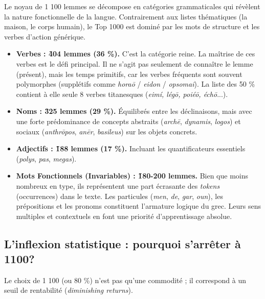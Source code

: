 {Le noyau de 1 100 lemmes se décompose en catégories grammaticales qui révèlent la nature
fonctionnelle de la langue. Contrairement aux listes thématiques (la maison, le corps humain), le
Top 1000 est dominé par les mots de structure et les verbes d'action générique.

\begin{itemize}\item \textbf{Verbes : \~ 404 lemmes (36 \%).} C'est la catégorie reine. La maîtrise de ces verbes est le défi principal. Il ne s'agit pas seulement de connaître le lemme (présent), mais les temps primitifs, car les verbes fréquents sont souvent polymorphes (supplétifs comme \textit{horaō} / \textit{eidon} / \textit{opsomai}). La liste des 50 \% contient à elle seule 8 verbes titanesques (\textit{eimí, légō, poiéō, échō}...).\cite{III-1-1-ref11}\item \textbf{Noms : \~ 325 lemmes (29 \%).} Équilibrés entre les déclinaisons, mais avec une forte prédominance de concepts abstraits (\textit{archē}, \textit{dynamis}, \textit{logos}) et sociaux (\textit{anthrōpos}, \textit{anēr}, \textit{basileus}) sur les objets concrets.\cite{III-1-1-ref14}\item \textbf{Adjectifs : \~ 188 lemmes (17 \%).} Incluant les quantificateurs essentiels (\textit{polys}, \textit{pas}, \textit{megas}).\cite{III-1-1-ref11}\item \textbf{Mots Fonctionnels (Invariables) : \~ 180-200 lemmes.} Bien que moins nombreux en type, ils représentent une part écrasante des \textit{tokens} (occurrences) dans le texte. Les particules (\textit{men}, \textit{de}, \textit{gar}, \textit{oun}), les prépositions et les pronoms constituent l'armature logique du grec. Leurs sens multiples et contextuels en font une priorité d'apprentissage absolue.\cite{III-1-1-ref12}\end{itemize}

\subsection{L'inflexion statistique : pourquoi s'arrêter à 1100?}

Le choix de 1 100 (ou 80 \%) n'est pas qu'une commodité ; il correspond à un seuil de rentabilité
(\textit{diminishing returns}).

}
